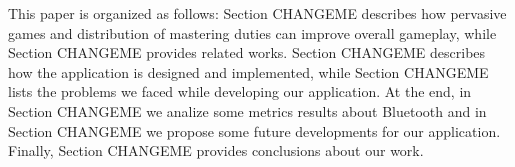  This paper is organized as follows: Section 
CHANGEME describes how pervasive games and distribution of mastering duties can 
improve overall gameplay, while Section CHANGEME provides related 
works. Section CHANGEME describes how the application is designed and 
implemented, while Section CHANGEME lists the problems we faced while developing 
our application. At the end, in Section CHANGEME we analize some metrics results 
about Bluetooth and in Section CHANGEME we propose some future developments for 
our application. Finally, Section CHANGEME provides conclusions about our work.
